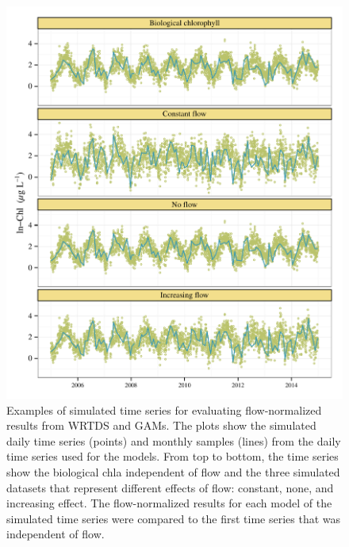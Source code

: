 \documentclass[letterpaper,12pt,oneside]{article}\usepackage[]{graphicx}\usepackage[]{color}
\makeatletter
\def\maxwidth{ %
  \ifdim\Gin@nat@width>\linewidth
    \linewidth
  \else
    \Gin@nat@width
  \fi
}
\makeatother
\begin{document}
\begin{figure}[!ht]

{\centering \includegraphics[width=\maxwidth]{figs/simex-1} 

}

\caption{Examples of simulated time series for evaluating flow-normalized results from \ac{WRTDS} and \acp{GAM}.  The plots show the simulated daily time series (points) and monthly samples (lines) from the daily time series used for the models.  From top to bottom, the time series show the biological \ac{chla} independent of flow and the three simulated datasets that represent different effects of flow: constant, none, and increasing effect.  The flow-normalized results for each model of the simulated time series were compared to the first time series that was independent of flow.}\label{fig:simex}
\end{figure}



\end{document}
